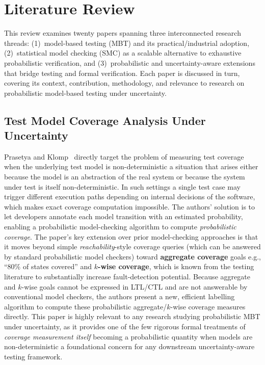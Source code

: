 \section{Literature Review}%
\label{sec:literature_review}

This review examines twenty papers spanning three interconnected research
threads: (1)~model-based testing (MBT) and its practical/industrial
adoption, (2)~statistical model checking (SMC) as a scalable alternative
to exhaustive probabilistic verification, and (3)~probabilistic and
uncertainty-aware extensions that bridge testing and formal verification.
Each paper is discussed in turn, covering its context, contribution,
methodology, and relevance to research on probabilistic model-based
testing under uncertainty.




\subsection{Test Model Coverage Analysis Under Uncertainty}
\label{sec:lr_prasetya}

Prasetya and Klomp~\cite{prasetya2021coverage} directly target the
problem of measuring test coverage when the underlying test model is
non-deterministic a situation that arises either because the model is
an abstraction of the real system or because the system under test is
itself non-deterministic.  In such settings a single test case may
trigger different execution paths depending on internal decisions of the
software, which makes exact coverage computation impossible.  The
authors' solution is to let developers annotate each model transition
with an estimated probability, enabling a probabilistic model-checking
algorithm to compute \emph{probabilistic coverage}.  The paper's key
extension over prior model-checking approaches is that it moves beyond
simple \emph{reachability}-style coverage queries (which can be answered
by standard probabilistic model checkers) toward \textbf{aggregate
coverage} goals e.g., ``80\% of states covered'' and
\textbf{$k$-wise coverage}, which is known from the testing literature
to substantially increase fault-detection potential.  Because aggregate
and $k$-wise goals cannot be expressed in LTL/CTL and are not answerable
by conventional model checkers, the authors present a new, efficient
labelling algorithm to compute these probabilistic aggregate/$k$-wise
coverage measures directly.  This paper is highly relevant to any
research studying probabilistic MBT under uncertainty, as it provides
one of the few rigorous formal treatments of \emph{coverage measurement
itself} becoming a probabilistic quantity when models are
non-deterministic a foundational concern for any downstream
uncertainty-aware testing framework.

